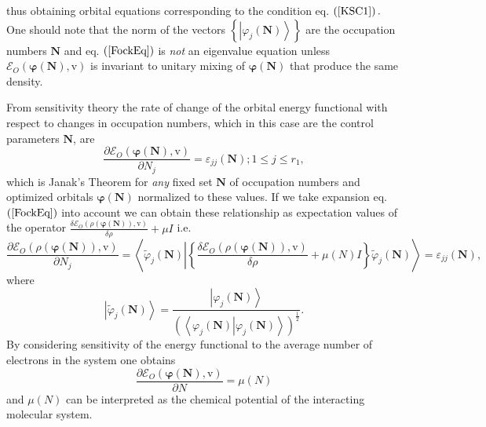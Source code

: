 \documentclass[aps,preprint]{revtex4}%
\begin{document}
thus obtaining orbital equations corresponding to the condition eq. $\left(
\ref{KSC1}\right)  .$ One should note that the norm of the vectors $\left\{
\left\vert \varphi_{j}\left(  \boldsymbol{N}\right)  \right\rangle \right\}  $
are the occupation numbers $\boldsymbol{N}$ and eq. $\left(  \ref{FockEq}%
\right)  $ is \emph{not }an eigenvalue equation unless $\mathcal{E}_{O}\left(
\boldsymbol{\varphi}\left(  \boldsymbol{N}\right)  ,\mathrm{v}\right)  $ is
invariant to unitary mixing of $\boldsymbol{\varphi}\left(  \boldsymbol{N}%
\right)  $ that produce the same density.

From sensitivity theory the rate of change of the orbital energy functional
with respect to changes in occupation numbers, which in this case are the
control parameters $\boldsymbol{N}$, are
\begin{equation}
\frac{\partial\mathcal{E}_{O}\left(  \boldsymbol{\varphi\left(  \boldsymbol{N}%
\right)  },\mathrm{v}\right)  }{\partial N_{j}}=\varepsilon_{jj}\left(
\boldsymbol{N}\right)  ;1\leq j\leq r_{1}, \label{Janak}%
\end{equation}
which is Janak's Theorem for \emph{any }fixed set $\boldsymbol{\boldsymbol{N}%
}$ of occupation numbers and optimized orbitals $\boldsymbol{\varphi\left(
\boldsymbol{N}\right)  }$ normalized to these values. If we take expansion eq.
$\left(  \ref{FockEq}\right)  $ into account we can obtain these relationship
as expectation values of the operator $\frac{\delta\mathcal{E}_{O}\left(
\rho\left(  \boldsymbol{\varphi\left(  \boldsymbol{N}\right)  }\right)
\boldsymbol{,}\mathrm{v}\right)  }{\delta\rho}+\mu I$ i.e.
\begin{equation}
\frac{\partial\mathcal{E}_{O}\left(  \rho\left(  \boldsymbol{\varphi\left(
\boldsymbol{N}\right)  }\right)  ,\mathrm{v}\right)  }{\partial N_{j}%
}=\left\langle \tilde{\varphi}_{j}\left(  \boldsymbol{N}\right)  \left\vert
\left\{  \frac{\delta\mathcal{E}_{O}\left(  \rho\left(  \boldsymbol{\varphi
\left(  \boldsymbol{N}\right)  }\right)  \boldsymbol{,}\mathrm{v}\right)
}{\delta\rho}+\mu\left(  N\right)  I\right\}  \right.  \tilde{\varphi}%
_{j}\left(  \boldsymbol{N}\right)  \right\rangle =\varepsilon_{jj}\left(
\boldsymbol{N}\right)  ,
\end{equation}
where
\begin{equation}
\left\vert \tilde{\varphi}_{j}\left(  \boldsymbol{N}\right)  \right\rangle
=\frac{\left\vert \varphi_{j}\left(  \boldsymbol{N}\right)  \right\rangle
}{\left(  \left\langle \left.  \varphi_{j}\left(  \boldsymbol{N}\right)
\right\vert \varphi_{j}\left(  \boldsymbol{N}\right)  \right\rangle \right)
^{\frac{1}{2}}}.
\end{equation}
By considering sensitivity of the energy functional to the average number of
electrons in the system one obtains
\begin{equation}
\frac{\partial\mathcal{E}_{O}\left(  \boldsymbol{\varphi}\left(
\boldsymbol{N}\right)  \boldsymbol{,}\mathrm{v}\right)  }{\partial N}%
=\mu\left(  N\right)
\end{equation}
and $\mu\left(  N\right)  $ can be interpreted as the chemical potential of
the interacting molecular system.
\end{document}
